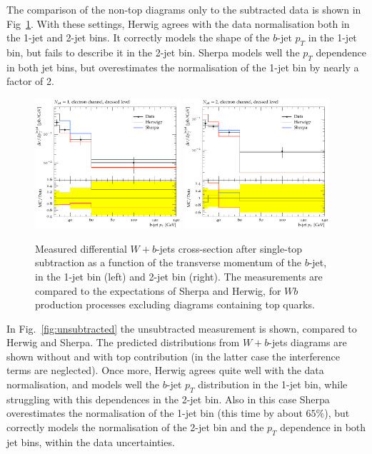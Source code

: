 \documentclass[11pt]{cernrep}
\begin{document}
The comparison of the non-top diagrams only to the subtracted data is shown in Fig~\ref{fig:subtracted}. 
With these settings, Herwig agrees with the data normalisation both in the 1-jet and 2-jet bins.
It correctly models the shape of the $b$-jet $p_T$ in the 1-jet bin, but fails to describe it in the 2-jet bin.
Sherpa models well the $p_T$ dependence in both jet bins, but overestimates the normalisation of the 1-jet bin 
by nearly a factor of 2.

\begin{figure}
\centering
	\includegraphics[width=0.48\textwidth]{subtracted_h7_s22-1jet.pdf}
	\includegraphics[width=0.48\textwidth]{subtracted_h7_s22-2jet.pdf}
\caption{\label{fig:subtracted}
  Measured differential $W+b$-jets cross-section after single-top subtraction as a function of the
  transverse momentum of the $b$-jet, in the 1-jet bin (left) and 2-jet bin (right). 
  The measurements are compared to the expectations of
  Sherpa and Herwig, for $Wb$ production processes excluding diagrams containing top quarks.}
\end{figure}

In Fig.~\ref{fig:unsubtracted} the unsubtracted measurement is shown, compared to Herwig and Sherpa.
The predicted distributions from $W+b$-jets diagrams are shown without and with top contribution (in the latter case the interference terms are neglected).
Once more, Herwig agrees quite well with the data normalisation, and models well the $b$-jet $p_T$ distribution in the 1-jet bin, 
while struggling with this dependences in the 2-jet bin. Also in this case Sherpa overestimates the normalisation of
the 1-jet bin (this time by about $65\%$), but correctly models the normalisation of the 2-jet bin
and the $p_T$ dependence in both jet bins, within the data uncertainties.
\end{document}

